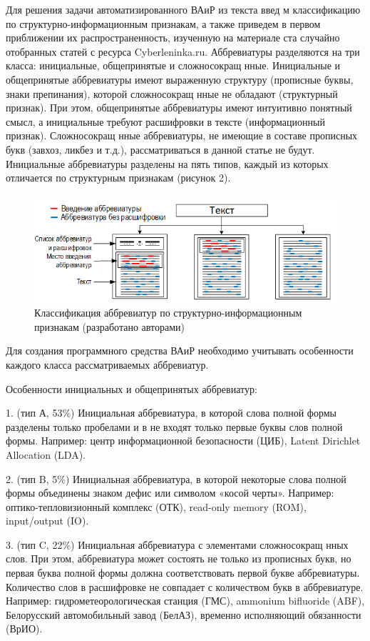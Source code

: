 \documentclass[a4paper]{article}
\begin{document}
Для решения задачи автоматизированного ВАиР из текста введ м классификацию по структурно-информационным признакам, а также приведем в первом приближении их распространенность, изученную на материале ста случайно отобранных статей с ресурса Cyberleninka.ru. Аббревиатуры разделяются на три класса: инициальные, общепринятые и сложносокращ нные. Инициальные и общепринятые аббревиатуры имеют выраженную структуру (прописные буквы, знаки препинания), которой сложносокращ нные не обладают (структурный признак). При этом, общепринятые аббревиатуры имеют интуитивно понятный смысл, а инициальные требуют расшифровки в тексте (информационный признак). Сложносокращ нные аббревиатуры, не имеющие в составе прописных букв (завхоз, ликбез и т.д.), рассматриваться в данной статье не будут. Инициальные аббревиатуры разделены на пять типов, каждый из которых отличается по структурным признакам (рисунок 2).\\

\begin{figure}[!h]
\centering
\includegraphics[scale=0.8]{abr.png}
\caption{Классификация аббревиатур по структурно-информационным признакам (разработано авторами)}
\label{claster_pic1}
\end{figure}

Для создания программного средства ВАиР необходимо учитывать особенности каждого класса рассматриваемых аббревиатур.

Особенности инициальных и общепринятых аббревиатур:

1. (тип А, 53\%) Инициальная аббревиатура, в которой слова полной формы разделены только пробелами и в не входят только первые буквы слов полной формы. Например: центр информационной безопасности (ЦИБ), Latent Dirichlet Allocation (LDA).

2. (тип B, 5\%) Инициальная аббревиатура, в которой некоторые слова полной формы объединены знаком дефис или символом «косой черты». Например: оптико-тепловизионный комплекс (ОТК), read-only memory (ROM), input/output (IO).

3. (тип C, 22\%) Инициальная аббревиатура с элементами сложносокращ нных слов. При этом, аббревиатура может состоять не только из прописных букв, но первая буква полной формы должна соответствовать первой букве аббревиатуры. Количество слов в расшифровке не совпадает с количеством букв в аббревиатуре. Например: гидрометеорологическая станция (ГМС), ammonium bifluoride (ABF), Белорусский автомобильный завод (БелАЗ), временно исполняющий обязанности (ВрИО).
\end{document}
